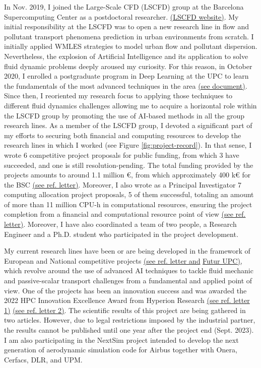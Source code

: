 \documentclass{article}
\begin{document}
In Nov. 2019, I joined the Large-Scale CFD (LSCFD) group at the Barcelona Supercomputing Center as a postdoctoral researcher. \href{https://www.bsc.es/discover-bsc/organisation/research-departments/large-scale-computational-fluid-dynamics}{(LSCFD website)}. 
My initial responsibility at the LSCFD was to open a new research line in flow and pollutant transport phenomena prediction in urban environments from scratch. I initially applied WMLES strategies to model urban flow and pollutant dispersion. Nevertheless, the explosion of Artificial Intelligence and its application to solve fluid dynamic problems deeply aroused my curiosity. For this reason, in October 2020, I enrolled a postgraduate program in Deep Learning at the UPC to learn the fundamentals of the most advanced techniques in the area \hyperlink{postgrau-DL.1}{(see document)}. Since then, I reoriented my research focus to applying those techniques to different fluid dynamics challenges allowing me to acquire a horizontal role within the LSCFD group by promoting the use of AI-based methods in all the group research lines. 
As a member of the LSCFD group, I devoted a significant part of my efforts to securing both financial and computing resources to develop the research lines in which I worked (see Figure \ref{fig:project-record}). In that sense, I wrote 6 competitive project proposals for public funding, from which 3 have succeeded, and one is still resolution-pending. The total funding provided by the projects amounts to around 1.1 million €, from which approximately 400 k€ for the BSC \hyperlink{projectes-bsc.1}{(see ref. letter)}. Moreover, I also wrote as a Principal Investigator 7 computing allocation project proposals, 5 of them successful, totaling an amount of more than 11 million CPU-h in computational resources, ensuring the project completion from a financial and computational resource point of view \hyperlink{projectes-res.1}{(see ref. letter)}. Moreover, I have also coordinated a team of two people, a Research Engineer and a Ph.D. student who participated in the project development. 

My current research lines have been or are being developed in the framework of European and National competitive projects \hyperlink{projectes-bsc.1}{(see ref. letter and} \href{https://futur.upc.edu/JoanCalafellSandiumenge/as/cGFydGljaXBhY2lvUHJvamVjdGVSRElDb21wZXRpdGl1}{ Futur UPC)}, which revolve around the use of advanced AI techniques to tackle fluid mechanic and passive-scalar transport challenges from a fundamental and applied point of view. One of the projects has been an innovation success and was awarded the 2022 HPC Innovation Excellence Award from Hyperion Research \hyperlink{hyperion-award.1}{(see ref. letter 1)} \hyperlink{carta-bettair.1}{(see ref. letter 2)}. The scientific results of this project are being gathered in two articles. However, due to legal restrictions imposed by the industrial partner, the results cannot be published until one year after the project end (Sept. 2023). I am also participating in the NextSim project intended to develop the next generation of aerodynamic simulation code for Airbus together with Onera, Cerfacs, DLR, and UPM. 
\end{document}
